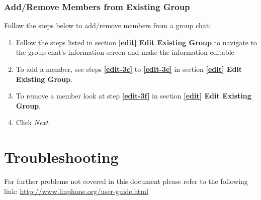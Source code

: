\documentclass[11pt]{article}
\begin{document}
\subsubsection{Add/Remove Members from Existing Group}  \label{add}
Follow the steps below to add/remove members from a group chat:
\begin{enumerate}
\item Follow the steps listed in section \textbf{\ref{edit} Edit Existing Group} to navigate to the group chat's information screen and make the information editable
\item To add a member, see steps \textbf{\ref{edit-3c}} to \textbf{\ref{edit-3e}} in section \textbf{\ref{edit} Edit Existing Group}.
\item To remove a member look at step \textbf{\ref{edit-3f}} in section \textbf{\ref{edit} Edit Existing Group}.
\item Click \textit{Next}.
\end{enumerate}


\section{Troubleshooting}

For further problems not covered in this document please refer to the following link:
\url{http://www.linphone.org/user-guide.html}
\end{document}
